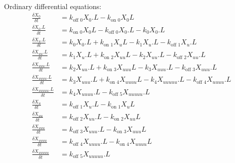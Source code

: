 \documentclass[11pt]{article}
\begin{document}
Ordinary differential equations:
\begin{align}
  \frac{\delta X_0}{\delta t} &= k_\text{off 0} X_0.L - k_\text{on 0} X_0  L\\
  \frac{\delta X_{0}.L}{\delta t} &= k_\text{on 0} X_0  L - k_\text{off 0} X_0.L - k_0 X_0.L\\
  \frac{\delta X_{u}.L}{\delta t} &= k_0 X_{0}.L + k_\text{on 1} X_{u}  L - k_1 X_{u}.L - k_\text{off 1} X_{u}.L\\
  \frac{\delta X_{uu}.L}{\delta t} &= k_1 X_{u}.L + k_\text{on 2} X_{uu}  L - k_2 X_{uu}.L - k_\text{off 2} X_{uu}.L\\
  \frac{\delta X_{uuu}.L}{\delta t} &= k_2 X_{uu}.L + k_\text{on 3} X_{uuu}  L - k_3 X_{uuu}.L - k_\text{off 3} X_{uuu}.L\\
  \frac{\delta X_{uuuu}.L}{\delta t} &= k_3 X_{uuu}.L + k_\text{on 4} X_{uuuu}  L - k_4 X_{uuuuu}.L - k_\text{off 4} X_{uuuu}.L\\
  \frac{\delta X_{uuuuu}.L}{\delta t} &= k_4 X_{uuuu}.L - k_\text{off 5} X_{uuuuu}.L\\
  \frac{\delta X_{u}}{\delta t} &= k_\text{off 1} X_{u}.L - k_\text{on 1} X_{u}  L\\
  \frac{\delta X_{uu}}{\delta t} &= k_\text{off 2} X_{uu}.L - k_\text{on 2} X_{uu}  L\\
  \frac{\delta X_{uuu}}{\delta t} &= k_\text{off 3} X_{uuu}.L - k_\text{on 3} X_{uuu} L\\
  \frac{\delta X_{uuuu}}{\delta t} &= k_\text{off 4} X_{uuuu}.L - k_\text{on 4} X_{uuuu}  L\\
  \frac{\delta X_{uuuuu}}{\delta t} &= k_\text{off 5} X_{uuuuu}.L
\end{align}



\end{document}

